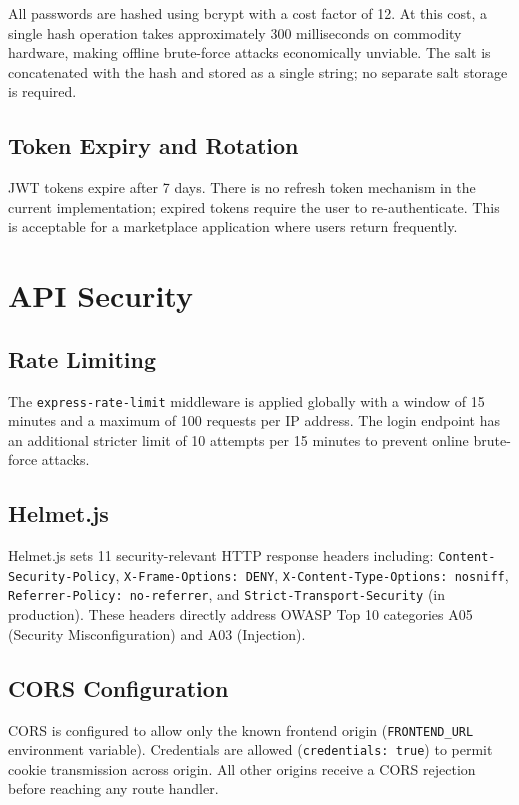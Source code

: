 \documentclass[12pt,a4paper]{report}
\begin{document}
All passwords are hashed using bcrypt with a cost factor of 12. At this cost, a single hash operation takes approximately 300 milliseconds on commodity hardware, making offline brute-force attacks economically unviable. The salt is concatenated with the hash and stored as a single string; no separate salt storage is required.

\subsection{Token Expiry and Rotation}

JWT tokens expire after 7 days. There is no refresh token mechanism in the current implementation; expired tokens require the user to re-authenticate. This is acceptable for a marketplace application where users return frequently.

\section{API Security}

\subsection{Rate Limiting}

The \texttt{express-rate-limit} middleware is applied globally with a window of 15 minutes and a maximum of 100 requests per IP address. The login endpoint has an additional stricter limit of 10 attempts per 15 minutes to prevent online brute-force attacks.

\subsection{Helmet.js}

Helmet.js sets 11 security-relevant HTTP response headers including:
\texttt{Content-Security-Policy}, \texttt{X-Frame-Options: DENY}, \texttt{X-Content-Type-Options: nosniff}, \texttt{Referrer-Policy: no-referrer}, and \texttt{Strict-Transport-Security} (in production). These headers directly address OWASP Top 10 categories A05 (Security Misconfiguration) and A03 (Injection).

\subsection{CORS Configuration}

CORS is configured to allow only the known frontend origin (\texttt{FRONTEND\_URL} environment variable). Credentials are allowed (\texttt{credentials: true}) to permit cookie transmission across origin. All other origins receive a CORS rejection before reaching any route handler.
\end{document}
